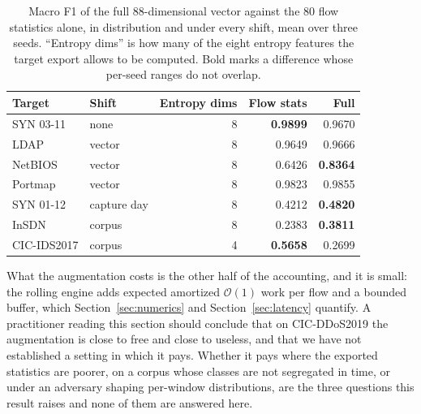 \documentclass{ieeeaccess}
\begin{document}
\begin{table}[!t]
\caption{Macro F1 of the full 88-dimensional vector against the 80 flow
statistics alone, in distribution and under every shift, mean over three seeds.
``Entropy dims'' is how many of the eight entropy features the target export
allows to be computed. Bold marks a difference whose per-seed ranges do not
overlap.}
\centering
\label{tab:entropyshift}
\footnotesize
\setlength{\tabcolsep}{4pt}
\renewcommand{\arraystretch}{1.15}
\begin{tabular}{@{}llrrr@{}}
\toprule
\textbf{Target} & \textbf{Shift} & \textbf{Entropy dims} &
\textbf{Flow stats} & \textbf{Full} \\
\midrule
SYN 03-11    & none          & 8 & \textbf{0.9899} & 0.9670 \\
\midrule
LDAP         & vector        & 8 & 0.9649 & 0.9666 \\
NetBIOS      & vector        & 8 & 0.6426 & \textbf{0.8364} \\
Portmap      & vector        & 8 & 0.9823 & 0.9855 \\
SYN 01-12    & capture day   & 8 & 0.4212 & \textbf{0.4820} \\
InSDN        & corpus        & 8 & 0.2383 & \textbf{0.3811} \\
CIC-IDS2017  & corpus        & 4 & \textbf{0.5658} & 0.2699 \\
\bottomrule
\end{tabular}
\end{table}

What the augmentation costs is the other half of the accounting, and it is
small: the rolling engine adds expected amortized $\mathcal{O}(1)$ work per flow
and a bounded buffer, which Section~\ref{sec:numerics} and
Section~\ref{sec:latency} quantify. A practitioner reading this section should
conclude that on CIC-DDoS2019 the augmentation is close to free and close to
useless, and that we have not established a setting in which it pays. Whether it
pays where the exported statistics are poorer, on a corpus whose classes are not
segregated in time, or under an adversary shaping per-window distributions, are
the three questions this result raises and none of them are answered here.
\end{document}
